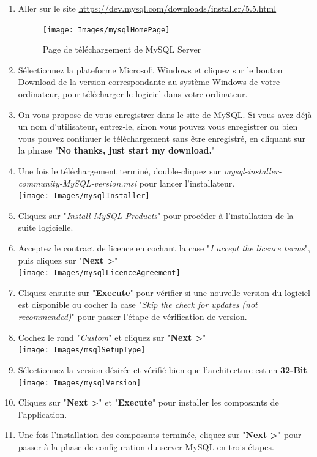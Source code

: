  \begin{enumerate}
 \item Aller sur le site \url{https://dev.mysql.com/downloads/installer/5.5.html}
 \begin{figure}
 \centering
 \texttt{[image: Images/mysqlHomePage]}
 \caption{Page de téléchargement de MySQL Server}
 \end{figure}
 \item Sélectionnez la plateforme Microsoft Windows et cliquez sur le bouton Download de la version 
correspondante au système Windows de votre ordinateur, pour télécharger le logiciel dans votre 
ordinateur.
\item On vous propose de vous enregistrer dans le site de MySQL. Si vous avez déjà un nom d’utilisateur, entrez-le, sinon vous pouvez vous enregistrer ou bien vous pouvez continuer le téléchargement sans être enregistré, en cliquant sur la phrase "\textbf{No thanks, just start my download.}"
\item Une fois le téléchargement terminé, double-cliquez sur \textit{mysql-installer-community-MySQL-version.msi} pour lancer l'installateur.\\
 \centering
 \texttt{[image: Images/mysqlInstaller]}
 \item Cliquez sur "\textit{Install MySQL Products}" pour procéder à l'installation de la suite logicielle.
 \item Acceptez le contract de licence en cochant la case "\textit{I accept the licence terms}", puis cliquez sur "\textbf{Next >}"\\
 \centering
 \texttt{[image: Images/mysqlLicenceAgreement]}
 \item Cliquez ensuite sur "\textbf{Execute}" pour vérifier si une nouvelle version du logiciel est disponible ou cocher la case "\textit{Skip the check for updates (not recommended)}" pour passer l'étape de vérification de version.
  \item  Cochez le rond "\textit{Custom}" et cliquez sur "\textbf{Next >}"\\
  \centering
  \texttt{[image: Images/msqlSetupType]}
  \item Sélectionnez la version désirée et vérifié bien que l'architecture est en \textbf{32-Bit}.\\
  \centering
  \texttt{[image: Images/mysqlVersion]}
  \item Cliquez sur "\textbf{Next >}" et "\textbf{Execute}" pour installer les composants de l'application.
  \item Une fois l'installation des composants terminée, cliquez sur "\textbf{Next >}" pour passer à la phase de configuration du server MySQL en trois étapes.\\

\end{enumerate}
